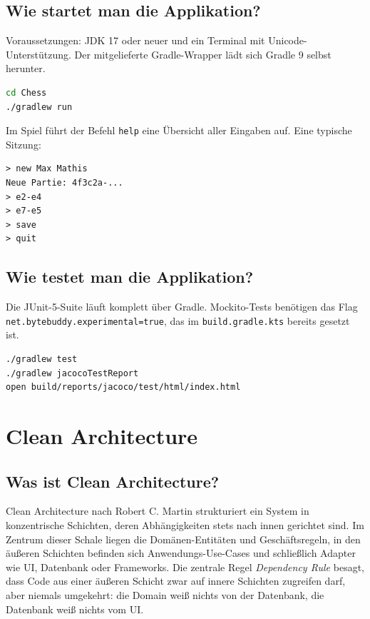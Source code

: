 \documentclass[a4paper,12pt]{article}
\let\oldsection\section
\renewcommand{\section}{\clearpage\oldsection}
\begin{document}
\subsection*{Wie startet man die Applikation?}

Voraussetzungen: JDK 17 oder neuer und ein Terminal mit Unicode-Unterstützung. Der mitgelieferte
Gradle-Wrapper lädt sich Gradle 9 selbst herunter.

\begin{lstlisting}[language=bash]
cd Chess
./gradlew run
\end{lstlisting}

Im Spiel führt der Befehl \texttt{help} eine Übersicht aller Eingaben auf. Eine typische Sitzung:

\begin{lstlisting}
> new Max Mathis
Neue Partie: 4f3c2a-...
> e2-e4
> e7-e5
> save
> quit
\end{lstlisting}

\subsection*{Wie testet man die Applikation?}

Die JUnit-5-Suite läuft komplett über Gradle. Mockito-Tests benötigen das Flag
\texttt{net.bytebuddy.experimental=true}, das im \texttt{build.gradle.kts} bereits
gesetzt ist.

\begin{lstlisting}[language=bash]
./gradlew test
./gradlew jacocoTestReport
open build/reports/jacoco/test/html/index.html
\end{lstlisting}

\section{Clean Architecture}

\subsection*{Was ist Clean Architecture?}

Clean Architecture nach Robert C. Martin strukturiert ein System in konzentrische Schichten, deren
Abhängigkeiten stets nach innen gerichtet sind. Im Zentrum dieser Schale liegen die
Domänen-Entitäten und Geschäftsregeln, in den äußeren Schichten befinden sich Anwendungs-Use-Cases und
schließlich Adapter wie UI, Datenbank oder Frameworks. Die zentrale Regel \emph{Dependency
Rule} besagt, dass Code aus einer äußeren Schicht zwar auf innere Schichten zugreifen darf, aber
niemals umgekehrt: die Domain weiß nichts von der Datenbank, die Datenbank weiß nichts vom UI.
\end{document}
